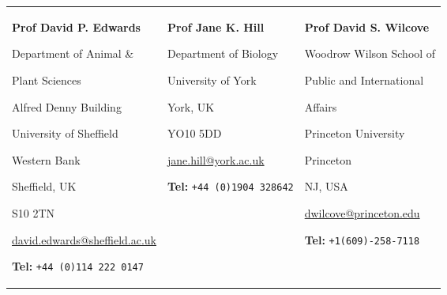 

\setlength{\tabcolsep}{0.5em} %
\begin{tabular}{ p{5.6cm} p{4.6cm} p{4.6cm}}
\textbf{Prof David P. Edwards}\par
Department of Animal \& 
    \par \hspace{0.5em} Plant Sciences\par 
Alfred Denny Building\par 
University of Sheffield\par
Western Bank \par
Sheffield, UK\par
S10 2TN\par
\url{david.edwards@sheffield.ac.uk}\par
\textbf{Tel:} {\texttt{+44 (0)114 222 0147}}
& 
\textbf{Prof Jane K. Hill}\par
Department of Biology\par
University of York\par
York, UK\par
YO10 5DD\par
\url{jane.hill@york.ac.uk}\par
\textbf{Tel:} {\texttt{+44 (0)1904 328642}}
& 
\textbf{Prof David S. Wilcove}\par
Woodrow Wilson School of 
    \par \hspace{0.5em}Public and International
    \par \hspace{0.5em}Affairs\par
Princeton University\par
Princeton\par
NJ, USA\par
\url{dwilcove@princeton.edu}\par
\textbf{Tel:} {\texttt{+1(609)-258-7118}}
\\
\end{tabular}

